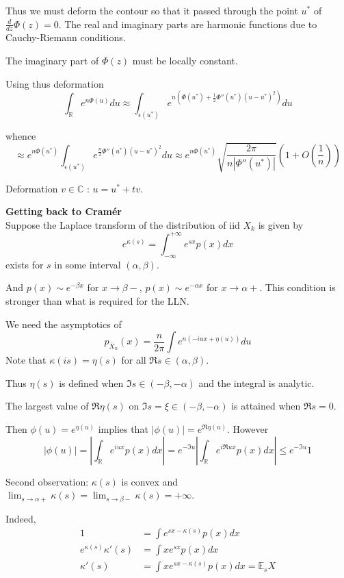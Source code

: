\documentclass[a4paper]{article}
\newcommand{\brac}[1]{{\left ( #1 \right )}}
\newcommand{\abs}[1]{{\left | #1 \right |}}
\newcommand{\Real}{\mathbb{R}}
\newcommand{\Cplx}{\mathbb{C}}
\newcommand{\Ex}{\mathbb{E}}
\begin{document}
Thus we must deform the contour so that it passed through the point $u^*$ of $\frac{d}{d z}\Phi(z) = 0$. The real and imaginary parts are harmonic functions due to Cauchy-Riemann conditions.

The imaginary part of $\Phi(z)$ must be locally constant.

Using thus deformation
\[\int_\Real e^{n\Phi(u)} du \approx \int_{\epsilon(u^*)} e^{n\brac{\Phi(u^*) + \frac{1}{2}\Phi''(u^*) \brac{u-u^*}^2}} du\]

whence 
\[\approx e^{n\Phi(u^*)} \int_{\epsilon(u^*)} e^{\frac{n}{2}\Phi''(u^*) {(u-u^*)}^2} du \approx e^{n\Phi(u^*)} \sqrt{\frac{2\pi}{n\abs{\Phi''(u^*)}}}\brac{1 + O(\frac{1}{n})}\]

Deformation $v\in \Cplx$ : $u = u^* + t v$.

\noindent \textbf{Getting back to Cram\'er} \hfill\\

Suppose the Laplace transform of the distribution of iid $X_k$ is given by
\[e^{\kappa(s)} = \int_{-\infty}^{+\infty} e^{sx} p(x) dx\]
exists for $s$ in some interval $\brac{\alpha,\beta}$.

And $p(x) \sim e^{-\beta x}$ for $x\to \beta-$, $p(x) \sim e^{-\alpha x}$ for $x\to \alpha+$. This condition is stronger than what is required for the LLN.

We need the asymptotics of
\[p_{\bar{X}_n}(x) = \frac{n}{2\pi}\int e^{n\brac{-iux + \eta(u)}} du\]
Note that $\kappa(is) = \eta(s)$ for all $\Re s \in \brac{\alpha, \beta}$.

Thus $\eta(s)$ is defined when $\Im s\in \brac{-\beta, -\alpha}$ and the integral is analytic.

The largest value of $\Re \eta(s)$ on $\Im s = \xi \in \brac{-\beta, -\alpha}$ is attained when $\Re s = 0$.

Then $\phi(u) = e^{\eta(u)}$ implies that $\abs{\phi(u)} = e^{\Re \eta(u)}$. However 
\[\abs{\phi(u)} = \abs{\int_\Real e^{iux} p(x) dx} = e^{-\Im u} \abs{ \int_\Real e^{i\Re u x} p(x) dx } \leq e^{-\Im u} 1 \]

Second observation: $\kappa(s)$ is convex and $\lim_{s\to \alpha+} \kappa(s) = \lim_{s\to \beta-} \kappa(s) = +\infty$.

Indeed, 
\begin{align*}
	1 &= \int e^{sx - \kappa(s)} p(x) dx \\
	e^{\kappa(s)} \kappa'(s) &= \int xe^{sx} p(x) dx \\
	\kappa'(s) &= \int xe^{sx - \kappa(s)} p(x) dx = \Ex_s X
\end{align*}
\end{document}
